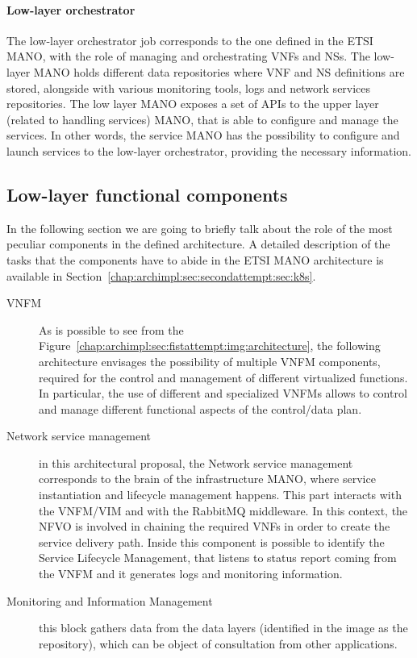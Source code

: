 \paragraph*{Low-layer orchestrator}
The low-layer orchestrator job corresponds to the one defined in the ETSI MANO,
with the role of managing and orchestrating VNFs and NSs. The low-layer MANO
holds different data repositories where VNF and NS definitions are stored,
alongside with various monitoring tools, logs and network services repositories.
The low layer MANO exposes a set of APIs to the upper layer (related to handling
services) MANO, that is able to configure and manage the services. In other
words, the service MANO has the possibility to configure and launch services to
the low-layer orchestrator, providing the necessary information.

\subsection{Low-layer functional components}
In the following section we are going to briefly talk about the role of the most
peculiar components in the defined architecture. A detailed description of the
tasks that the components have to abide in the ETSI MANO architecture is
available in Section~\ref{chap:archimpl:sec:secondattempt:sec:k8s}.
\begin{description}
\item[VNFM] As is possible to see from the
  Figure~\ref{chap:archimpl:sec:fistattempt:img:architecture}, the following
  architecture envisages the possibility of multiple VNFM components, required
  for the control and management of different virtualized functions. In
  particular, the use of different and specialized VNFMs allows to control and
  manage different functional aspects of the control/data plan.
\item[Network service management] in this architectural proposal, the Network
  service management corresponds to the brain of the infrastructure MANO, where
  service instantiation and lifecycle management happens. This part interacts
  with the VNFM/VIM and with the RabbitMQ middleware. In this context, the NFVO
  is involved in chaining the required VNFs in order to create the service
  delivery path. Inside this component is possible to identify the Service
  Lifecycle Management, that listens to status report coming from the VNFM and
  it generates logs and monitoring information.
\item[Monitoring and Information Management] this block gathers data from the
  data layers (identified in the image as the repository), which can be object
  of consultation from other applications.
\end{description}

